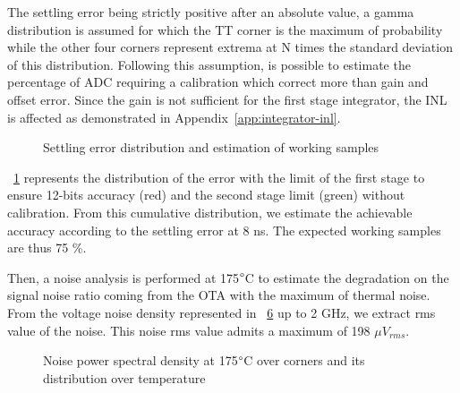 The settling error being strictly positive after an absolute value, a gamma distribution is assumed for which the TT corner is the maximum of probability while the other four corners represent extrema at N times the standard deviation of this distribution. Following this assumption, is possible to estimate the percentage of ADC requiring a calibration which correct more than gain and offset error. Since the gain is not sufficient for the first stage integrator, the INL is affected as demonstrated in Appendix~\ref{app:integrator-inl}.

\begin{figure}[htp]
    \centering
    \begin{subfigure}[b]{0.39\textwidth}
        \resizebox{\textwidth}{!}{
            
        }
        \label{fig:ota_error_dist}
    \end{subfigure}
    \begin{subfigure}[b]{0.58\textwidth}
        \resizebox{\textwidth}{!}{
            
        }
        \label{fig:ota_working_samples}
    \end{subfigure}
    \caption{Settling error distribution and estimation of working samples}
    \label{fig:ota_dist_sample}
\end{figure}

\figurename~\ref{fig:ota_error_dist} represents the distribution of the error with the limit of the first stage to ensure 12-bits accuracy (red) and the second stage limit (green) without calibration. From this cumulative distribution, we estimate the achievable accuracy according to the settling error at 8 ns. The expected working samples are thus 75 \%. 

Then, a noise analysis is performed at 175\(\degree \)C to estimate the degradation on the signal noise ratio coming from the OTA with the maximum of thermal noise. From the voltage noise density represented in \figurename~\ref{fig:ota_noise_psd} up to 2 GHz, we extract rms value of the noise. This noise rms value admits a maximum of 198 \(\mu V_{rms} \).

\begin{figure}[htp]
    \centering
    \begin{subfigure}[b]{0.43\textwidth}
        \resizebox{\textwidth}{!}{
            
        }
        \label{fig:noise_spectral_density}
    \end{subfigure}
    \begin{subfigure}[b]{0.56\textwidth}
        \resizebox{\textwidth}{!}{
            
        }
        \label{fig:noise_spectral_density}
    \end{subfigure}
    \caption{Noise power spectral density at 175\(\degree \)C over corners and its distribution over temperature}
    \label{fig:ota_noise_psd}
\end{figure}
\clearpage

